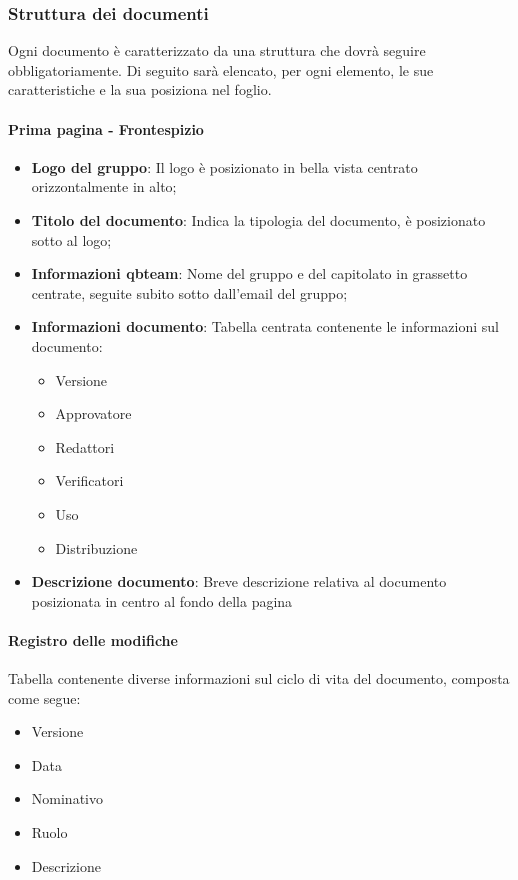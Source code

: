 \subsubsection{Struttura dei documenti}
Ogni documento è caratterizzato da una struttura che dovrà seguire obbligatoriamente.
Di seguito sarà elencato, per ogni elemento, le sue caratteristiche e la sua posiziona nel foglio.

\paragraph{Prima pagina - Frontespizio} 
\begin{itemize}
\item \textbf{Logo del gruppo}: Il logo è posizionato in bella vista centrato orizzontalmente in alto;
\item \textbf{Titolo del documento}: Indica la tipologia del documento, è posizionato sotto al logo;
\item \textbf{Informazioni qbteam}: Nome del gruppo e del capitolato in grassetto centrate, seguite subito sotto dall'email del gruppo; 
\item \textbf{Informazioni documento}: Tabella centrata contenente le informazioni sul documento:
\begin{itemize}
\item Versione
\item Approvatore
\item Redattori
\item Verificatori
\item Uso
\item Distribuzione
\end{itemize}
\item \textbf{Descrizione documento}: Breve descrizione relativa al documento posizionata in centro al fondo della pagina
\end{itemize}

\paragraph{Registro delle modifiche} 
Tabella contenente diverse informazioni sul ciclo di vita del documento, composta come segue:
\begin{itemize}
\item Versione
\item Data
\item Nominativo
\item Ruolo
\item Descrizione
\end{itemize}

